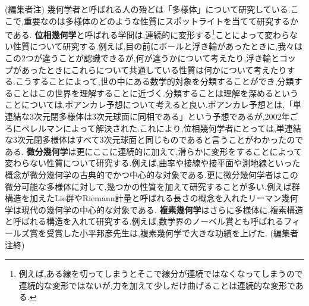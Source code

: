 (編集者注)
幾何学者と呼ばれる人の殆どは「多様体」について研究している.ここで,重要なのは多様体のどのような性質にスポットライトを当てて研究するかである.\textbf{ 位相幾何学}と呼ばれる学問は,連続的に変形する\footnote{例えば,ある線を切ってしまうとそこで線分が連続ではなくなってしまうので連続的な変形ではないが,力を加えて少しだけ曲げることは連続的な変形である.}ことによって変わらない性質について研究する.例えば,目の前にボールと浮き輪があったときに,我々はこの2つが違うことが認識できるが,何が違うかについて考えたり,浮き輪とコップがあったときにこれらについて共通している性質は何かについて考えたりする.こうすることによって,世の中にある数学的対象を分類することができ,分類することはこの世界を理解することに近づく.分類することは理解を深めるということについては,ポアンカレ予想について考えると良い.ポアンカレ予想とは,「単連結な3次元閉多様体は3次元球面に同相である」という予想であるが,2002年ごろにペレルマンによって解決された.これにより,位相幾何学者にとっては,単連結な3次元閉多様体はすべて3次元球面と同じものであると言うことがわかったのである.
\textbf{微分幾何学}は更にここに連続的に加えて,滑らかに変形をすることによって変わらない性質について研究する.例えば,曲率や接線や接平面や測地線といった概念が微分幾何学の古典的でかつ中心的な対象である.更に微分幾何学者はこの微分可能な多様体に対して,幾つかの性質を加えて研究することが多い.例えば群構造を加えたLie群やRiemann計量と呼ばれる長さの概念を入れたリーマン幾何学は現代の幾何学の中心的な対象である.
\textbf{複素幾何学}はさらに多様体に,複素構造と呼ばれる構造を入れて研究する.例えば,数学界のノーベル賞とも呼ばれるフィールズ賞を受賞した小平邦彦先生は,複素幾何学で大きな功績を上げた.
(編集者注終)